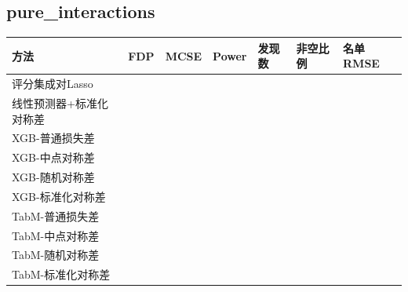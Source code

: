 \documentclass[UTF8,11pt,a4paper]{ctexart}
\begin{document}
\subsection{pure\_interactions}\label{pure_interactions}

{\def\LTcaptype{none} %
{
\footnotesize
\begin{longtable}[]{@{}
  >{\raggedright\arraybackslash}p{}
  >{\raggedright\arraybackslash}p{}
  >{\raggedright\arraybackslash}p{}
  >{\raggedright\arraybackslash}p{}
  >{\raggedright\arraybackslash}p{}
  >{\raggedright\arraybackslash}p{}
  >{\raggedright\arraybackslash}p{}@{}}
\toprule\noalign{}
\begin{minipage}[b]{\linewidth}\raggedright
方法
\end{minipage} & \begin{minipage}[b]{\linewidth}\raggedright
FDP
\end{minipage} & \begin{minipage}[b]{\linewidth}\raggedright
MCSE
\end{minipage} & \begin{minipage}[b]{\linewidth}\raggedright
Power
\end{minipage} & \begin{minipage}[b]{\linewidth}\raggedright
发现数
\end{minipage} & \begin{minipage}[b]{\linewidth}\raggedright
非空比例
\end{minipage} & \begin{minipage}[b]{\linewidth}\raggedright
名单RMSE
\end{minipage} \\
\midrule\noalign{}
\endhead
\bottomrule\noalign{}
\endlastfoot
评分集成对Lasso & 0.0639 & 0.0221 & 0.0090 & 0.45 & 0.08 & 1.2239 \\
线性预测器+标准化对称差 & 0.0155 & 0.0109 & 0.0030 & 0.13 & 0.02 & 1.2233 \\
XGB-普通损失差 & 0.1793 & 0.0157 & 0.9830 & 12.57 & 1.00 & 1.0245 \\
XGB-中点对称差 & 0.1471 & 0.0128 & 0.9310 & 11.25 & 1.00 & 1.0306 \\
XGB-随机对称差 & 0.1690 & 0.0148 & 0.9370 & 11.75 & 1.00 & 1.0292 \\
XGB-标准化对称差 & 0.1620 & 0.0165 & 0.7090 & 9.34 & 0.88 & 1.0792 \\
TabM-普通损失差 & 0.1517 & 0.0145 & 1.0000 & 12.25 & 1.00 & 1.0125 \\
TabM-中点对称差 & 0.1565 & 0.0151 & 0.9980 & 12.31 & 1.00 & 1.0137 \\
TabM-随机对称差 & 0.1545 & 0.0144 & 0.9970 & 12.22 & 1.00 & 1.0157 \\
TabM-标准化对称差 & 0.1528 & 0.0149 & 0.9340 & 11.58 & 0.98 & 1.0279 \\
\end{longtable}
}
}
\end{document}
